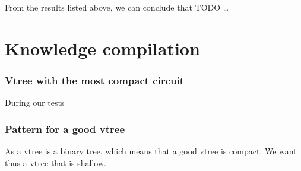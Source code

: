From the results listed above, we can conclude that  TODO \ldots

\section{Knowledge compilation}
\subsubsection{Vtree with the most compact circuit}
During our tests 
\subsubsection{Pattern for a good vtree}
As a vtree is a binary tree, which means that a good vtree is compact. We want thus a vtree that is shallow. 

